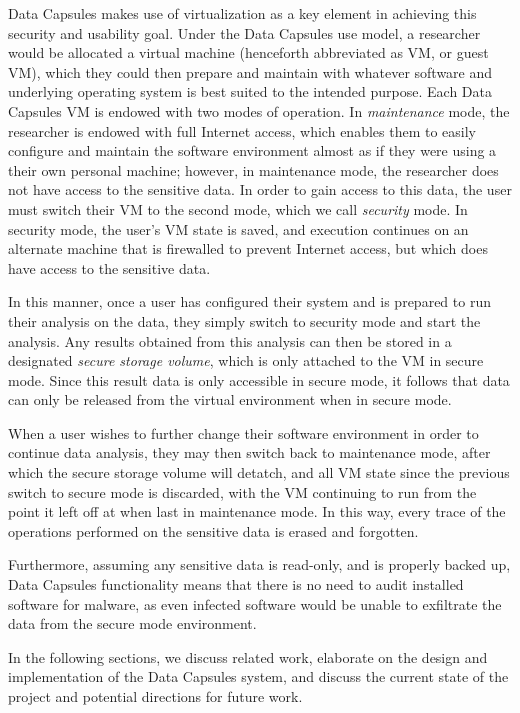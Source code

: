 \documentclass{acm_proc_article-sp}
\begin{document}
Data Capsules makes use of virtualization as a key element in achieving this
security and usability goal.  Under the Data Capsules use model, a researcher
would be allocated a virtual machine (henceforth abbreviated as VM, or guest
VM), which they could then prepare and maintain with whatever software and
underlying operating system is best suited to the intended purpose.  Each Data
Capsules VM is endowed with two modes of operation.  In \emph{maintenance} mode,
the researcher is endowed with full Internet access, which enables them to
easily configure and maintain the software environment almost as if they were
using a their own personal machine; however, in maintenance mode, the researcher
does not have access to the sensitive data.  In order to gain access to this
data, the user must switch their VM to the second mode, which we call
\emph{security} mode.  In security mode, the user's VM state is saved, and
execution continues on an alternate machine that is firewalled to prevent
Internet access, but which does have access to the sensitive data.

In this manner, once a user has configured their system and is prepared to
run their analysis on the data, they simply switch to security mode and start
the analysis.  Any results obtained from this analysis can then be stored in a
designated \emph{secure storage volume}, which is only attached to the VM in
secure mode.  Since this result data is only accessible in secure mode, it
follows that data can only be released from the virtual environment when in
secure mode.

When a user wishes to further change their software environment in order to
continue data analysis, they may then switch back to maintenance mode, after
which the secure storage volume will detatch, and all VM state since the
previous switch to secure mode is discarded, with the VM continuing to run from
the point it left off at when last in maintenance mode.  In this way, every
trace of the operations performed on the sensitive data is erased and forgotten.

Furthermore, assuming any sensitive data is read-only, and is properly backed
up, Data Capsules functionality means that there is no need to audit installed
software for malware, as even infected software would be unable to exfiltrate
the data from the secure mode environment.

In the following sections, we discuss related work, elaborate on the design and implementation of the Data Capsules system, and discuss the current state of the project and potential directions for future work.
\end{document}
